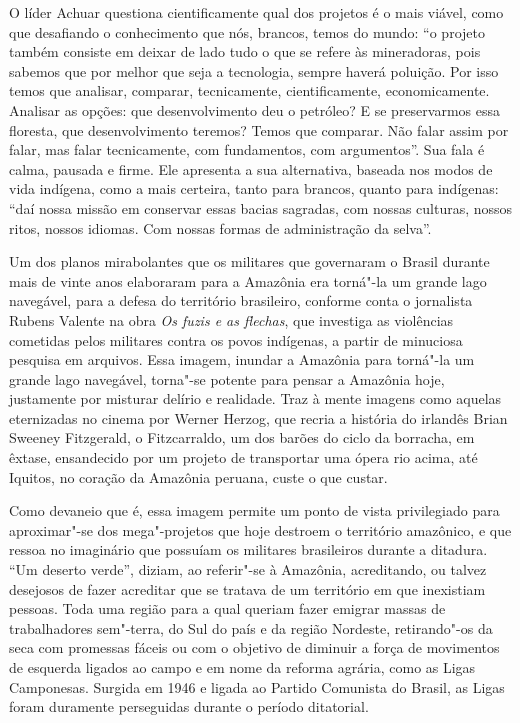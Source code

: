 O líder Achuar questiona cientificamente qual dos projetos é o mais
viável, como que desafiando o conhecimento que nós, brancos, temos do
mundo: ``o projeto também consiste em deixar de lado tudo o que se
refere às mineradoras, pois sabemos que por melhor que seja a
tecnologia, sempre haverá poluição. Por isso temos que analisar,
comparar, tecnicamente, cientificamente, economicamente. Analisar as
opções: que desenvolvimento deu o petróleo? E se preservarmos essa
floresta, que desenvolvimento teremos? Temos que comparar. Não falar
assim por falar, mas falar tecnicamente, com fundamentos, com
argumentos''. Sua fala é calma, pausada e firme. Ele apresenta a sua
alternativa, baseada nos modos de vida indígena, como a mais certeira,
tanto para brancos, quanto para indígenas: ``daí nossa missão em
conservar essas bacias sagradas, com nossas culturas, nossos ritos,
nossos idiomas. Com nossas formas de administração da selva''.

\asterisc

Um dos planos mirabolantes que os militares que governaram o Brasil
durante mais de vinte anos elaboraram para a Amazônia era torná"-la um
grande lago navegável, para a defesa do território brasileiro, conforme
conta o jornalista Rubens Valente na obra \emph{Os fuzis e as flechas},
que investiga as violências cometidas pelos militares contra os povos
indígenas, a partir de minuciosa pesquisa em arquivos. Essa imagem,
inundar a Amazônia para torná"-la um grande lago navegável, torna"-se
potente para pensar a Amazônia hoje, justamente por misturar delírio e
realidade. Traz à mente imagens como aquelas eternizadas no cinema por
Werner Herzog, que recria a história do irlandês Brian Sweeney
Fitzgerald, o Fitzcarraldo, um dos barões do ciclo da borracha, em
êxtase, ensandecido por um projeto de transportar uma ópera rio acima,
até Iquitos, no coração da Amazônia peruana, custe o que custar.

Como devaneio que é, essa imagem permite um ponto de vista privilegiado
para aproximar"-se dos mega"-projetos que hoje destroem o território
amazônico, e que ressoa no imaginário que possuíam os militares
brasileiros durante a ditadura. ``Um deserto verde'', diziam, ao
referir"-se à Amazônia, acreditando, ou talvez desejosos de fazer
acreditar que se tratava de um território em que inexistiam pessoas.
Toda uma região para a qual queriam fazer emigrar massas de
trabalhadores sem"-terra, do Sul do país e da região Nordeste,
retirando"-os da seca com promessas fáceis ou com o objetivo de diminuir
a força de movimentos de esquerda ligados ao campo e em nome da reforma
agrária, como as Ligas Camponesas. Surgida em 1946 e ligada ao Partido
Comunista do Brasil, as Ligas foram duramente perseguidas durante o
período ditatorial.

